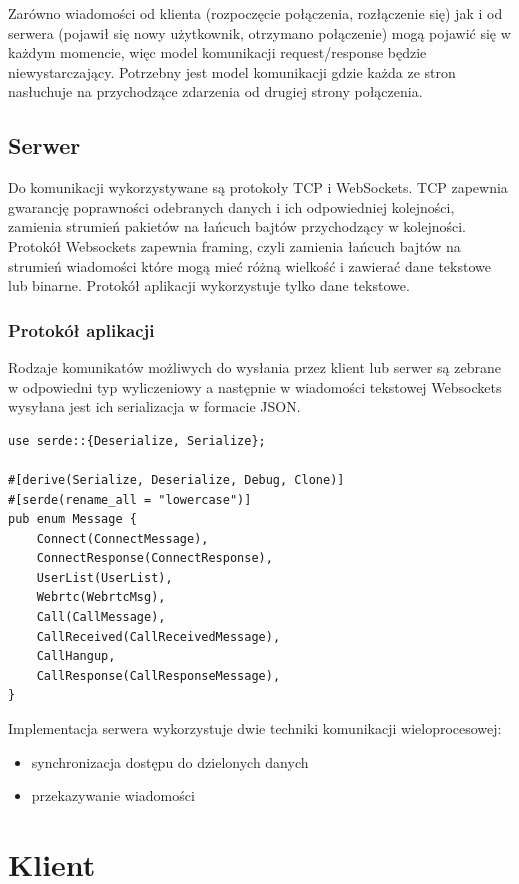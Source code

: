 Zarówno wiadomości od klienta (rozpoczęcie połączenia, rozłączenie się) jak i od serwera (pojawił
się nowy użytkownik, otrzymano połączenie) mogą pojawić się w każdym momencie, więc model
komunikacji request/response będzie niewystarczający. Potrzebny jest model komunikacji gdzie każda
ze stron nasłuchuje na przychodzące zdarzenia od drugiej strony połączenia.

\subsection{Serwer}

Do komunikacji wykorzystywane są protokoły TCP i WebSockets. TCP zapewnia gwarancję poprawności
odebranych danych i ich odpowiedniej kolejności, zamienia strumień pakietów na łańcuch bajtów
przychodzący w kolejności. Protokół Websockets zapewnia framing, czyli zamienia łańcuch bajtów na
strumień wiadomości które mogą mieć różną wielkość i zawierać dane tekstowe lub binarne. Protokół
aplikacji wykorzystuje tylko dane tekstowe.

\subsubsection{Protokół aplikacji}

Rodzaje komunikatów możliwych do wysłania przez klient lub serwer są zebrane w odpowiedni typ
wyliczeniowy a następnie w wiadomości tekstowej Websockets wysyłana jest ich serializacja w formacie
JSON.

\begin{verbatim}
use serde::{Deserialize, Serialize};

#[derive(Serialize, Deserialize, Debug, Clone)]
#[serde(rename_all = "lowercase")]
pub enum Message {
    Connect(ConnectMessage),
    ConnectResponse(ConnectResponse),
    UserList(UserList),
    Webrtc(WebrtcMsg),
    Call(CallMessage),
    CallReceived(CallReceivedMessage),
    CallHangup,
    CallResponse(CallResponseMessage),
}
\end{verbatim}

Implementacja serwera wykorzystuje dwie techniki komunikacji wieloprocesowej:

\begin{itemize}
	\item synchronizacja dostępu do dzielonych danych
	\item przekazywanie wiadomości
\end{itemize}

\section{Klient}


